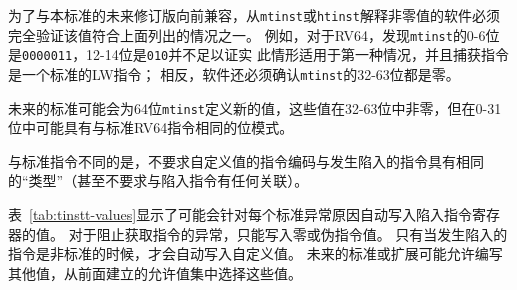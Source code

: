 \begin{commentary}
  为了与本标准的未来修订版向前兼容，从{\tt mtinst}或{\tt htinst}解释非零值的软件必须完全验证该值符合上面列出的情况之一。
  例如，对于RV64，发现{\tt mtinst}的0-6位是{\tt 0000011}，12-14位是{\tt 010}并不足以证实
  此情形适用于第一种情况，并且捕获指令是一个标准的LW指令；
  相反，软件还必须确认{\tt mtinst}的32-63位都是零。

未来的标准可能会为64位{\tt mtinst}定义新的值，这些值在32-63位中非零，但在0-31位中可能具有与标准RV64指令相同的位模式。
\end{commentary}

\begin{commentary}
  与标准指令不同的是，不要求自定义值的指令编码与发生陷入的指令具有相同的“类型”（甚至不要求与陷入指令有任何关联）。
\end{commentary}

表~\ref{tab:tinstt-values}显示了可能会针对每个标准异常原因自动写入陷入指令寄存器的值。
对于阻止获取指令的异常，只能写入零或伪指令值。
只有当发生陷入的指令是非标准的时候，才会自动写入自定义值。
未来的标准或扩展可能允许编写其他值，从前面建立的允许值集中选择这些值。

